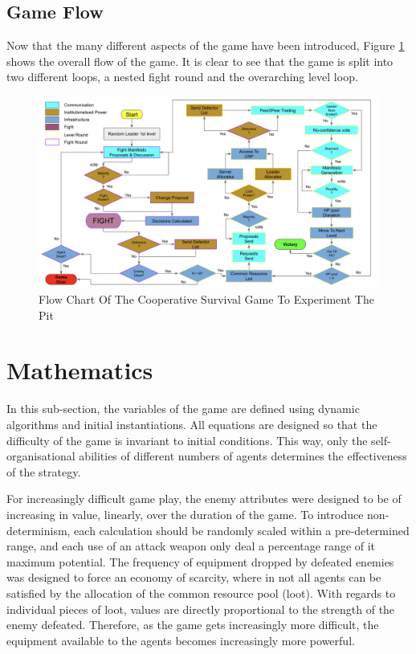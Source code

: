 \subsection{Game Flow}\label{sec:game flow}

Now that the many different aspects of the game have been introduced, Figure \ref{fig:game flow} shows the overall flow of the game. It is clear to see that the game is split into two different loops, a nested fight round and the overarching level loop. 

\begin{figure}[htb]
    \centering
    \includegraphics[scale=0.45]{001_game_design/images/gameflow.png}
    \caption{Flow Chart Of The Cooperative Survival Game To Experiment The Pit}
    \label{fig:game flow}
\end{figure}

\section{Mathematics}\label{sec: maths}

In this sub-section, the variables of the game are defined using dynamic algorithms and initial instantiations. All equations are designed so that the difficulty of the game is invariant to initial conditions. This way, only the self-organisational abilities of different numbers of agents determines the effectiveness of the strategy. 

For increasingly difficult game play, the enemy attributes were designed to be of increasing in value, linearly, over the duration of the game. To introduce non-determinism, each calculation should be randomly scaled within a pre-determined range, and each use of an attack weapon only deal a percentage range of it maximum potential. The frequency of equipment dropped by defeated enemies was designed to force an economy of scarcity, where in not all agents can be satisfied by the allocation of the common resource pool (loot). With regards to individual pieces of loot, values are directly proportional to the strength of the enemy defeated. Therefore, as the game gets increasingly more difficult, the equipment available to the agents becomes increasingly more powerful.  

